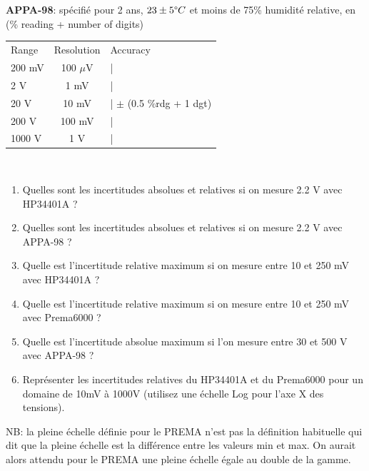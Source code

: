 \\
\\
\textbf{APPA-98}: spécifié pour 2 ans, $23 \pm 5 \degree C$ et moins de 75\% humidité relative, en (\% reading + number of digits)
\\
\begin{tabular}{lcl}
    \hline
    Range  & Resolution & Accuracy                     \\
    200 mV & 100 $\mu$V & |                            \\
    2 V    & 1 mV       & |                            \\
    20 V   & 10 mV      & |  $\pm$ (0.5 \%rdg + 1 dgt) \\
    200 V  & 100 mV     & |                            \\
    1000 V & 1 V        & |                            \\
    \hline
\end{tabular}
\\

\begin{enumerate}
    \item Quelles sont les incertitudes absolues et relatives si on mesure 2.2 V avec HP34401A ?
    \item Quelles sont les incertitudes absolues et relatives si on mesure 2.2 V avec APPA-98 ?
    \item Quelle est l'incertitude relative maximum si on mesure entre 10 et 250 mV avec HP34401A ?
    \item Quelle est l'incertitude relative maximum si on mesure entre 10 et 250 mV avec Prema6000 ?
    \item Quelle est l'incertitude absolue maximum si l'on mesure entre 30 et 500 V avec APPA-98 ?
    \item Représenter les incertitudes relatives du HP34401A et du Prema6000 pour un domaine de 10mV à 1000V (utilisez une échelle Log pour l'axe X des tensions).
\end{enumerate}
NB: la pleine échelle définie pour le PREMA n'est pas la définition habituelle qui dit que la pleine échelle est la différence entre les valeurs min et max. On aurait alors attendu pour le PREMA une pleine échelle égale au double de la gamme.

